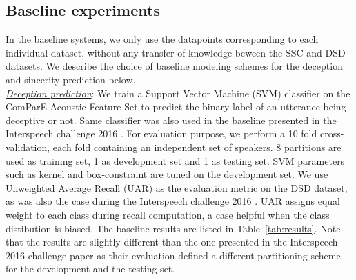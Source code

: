 \documentclass{article}
\begin{document}
\subsection{Baseline experiments}

In the baseline systems, we only use the datapoints corresponding to each individual dataset, without any transfer of knowledge beween the SSC and DSD datasets.
We describe the choice of baseline modeling schemes for the deception and sincerity prediction below.
\\

\noindent\underline{\it Deception prediction}: 
We train a Support Vector Machine (SVM) classifier on the ComParE Acoustic Feature Set \cite{weninger2013acoustics} to predict the binary label of an utterance being deceptive or not.
Same classifier was also used in the baseline presented in the Interspeech challenge 2016 \cite{schuller2016interspeech}.
For evaluation purpose, we perform a 10 fold cross-validation, each fold containing an independent set of speakers.  
8 partitions are used as training set, 1 as development set and 1 as testing set.
SVM parameters such as kernel and box-constraint are tuned on the development set.
We use Unweighted Average Recall (UAR) as the evaluation metric on the DSD dataset, as was also the case during the Interspeech challenge 2016 \cite{schuller2016interspeech}.
UAR assigns equal weight to each class during recall computation, a case helpful when the class distibution is biased. 
The baseline results are listed in Table~\ref{tab:results}.
Note that the results are slightly different than the one presented in the Interspeech 2016 challenge paper \cite{schuller2016interspeech} as their evaluation defined a different partitioning scheme for the development and the testing set.
\\
\end{document}
